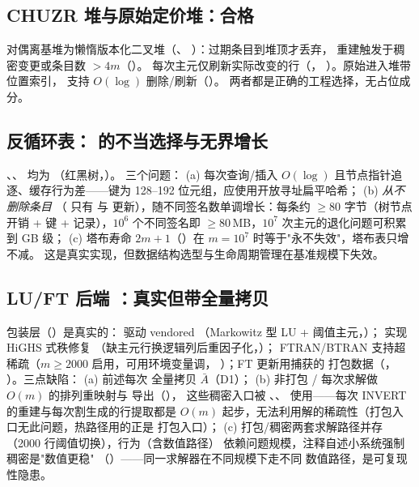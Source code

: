 \documentclass[11pt]{ctexart}
\begin{document}
\subsection{CHUZR 堆与原始定价堆：合格}
对偶离基堆为懒惰版本化二叉堆（、
）：过期条目到堆顶才丢弃，
重建触发于稠密变更或条目数 $>4m$（）。
每次主元仅刷新实际改变的行（，
）。原始进入堆带位置索引，
支持 $O(\log)$ 删除/刷新（）。
两者都是正确的工程选择，无占位成分。

\subsection{反循环表： 的不当选择与无界增长}
、、
均为 （红黑树，）。
三个问题：
(a) 每次查询/插入 $O(\log)$ 且节点指针追逐、缓存行为差——键为
128--192 位元组，应使用开放寻址扁平哈希；
(b)  \emph{从不删除条目}
（ 只有  与
 更新），随不同签名数单调增长：每条约
$\ge 80$ 字节（树节点开销 + 键 + 记录），$10^{6}$ 个不同签名即
$\ge 80\,$MB，$10^{7}$ 次主元的退化问题可积累到 GB 级；
(c) 塔布寿命 $2m+1$（）在
$m=10^{7}$ 时等于"永不失效"，塔布表只增不减。
这是真实实现，但数据结构选型与生命周期管理在基准规模下失效。

\subsection{LU/FT 后端 ：真实但带全量拷贝}
包装层（）是真实的：
 驱动 vendored （Markowitz 型
LU + 阈值主元，）；
 实现 HiGHS 式秩修复
（缺主元行换逻辑列后重因子化，）；
FTRAN/BTRAN 支持超稀疏（$m\ge 2000$ 启用，可用环境变量调，
）；FT 更新用捕获的
 打包数据（，
）。三点缺陷：
(a) 前述每次  全量拷贝 $\bar A$（D1）；
(b) 非打包 / 每次求解做 $O(m)$ 的排列重映射与
 导出（），
这些稠密入口被 、、
 使用——每次 INVERT 的重建与每次割生成的行提取都是
$O(m)$ 起步，无法利用解的稀疏性（打包入口无此问题，热路径用的正是
打包入口）；
(c) 打包/稠密两套求解路径并存（2000 行阈值切换），行为（含数值路径）
依赖问题规模，注释自述小系统强制稠密是"数值更稳"
（）——同一求解器在不同规模下走不同
数值路径，是可复现性隐患。
\end{document}
